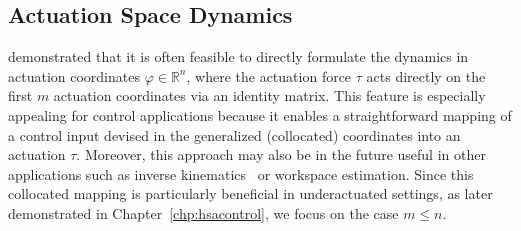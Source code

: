 \subsection{Actuation Space Dynamics}\label{sub:background:dynamics:actuation_space}
\citet{pustina2024input} demonstrated that it is often feasible to directly formulate the dynamics in actuation coordinates $\varphi \in \mathbb{R}^n$, where the actuation force $\tau$ acts directly on the first $m$ actuation coordinates via an identity matrix. This feature is especially appealing for control applications because it enables a straightforward mapping of a control input devised in the generalized (collocated) coordinates into an actuation $\tau$. Moreover, this approach may also be in the future useful in other applications such as inverse kinematics~\citep{della2025pushing} or workspace estimation. Since this collocated mapping is particularly beneficial in underactuated settings, as later demonstrated in Chapter~\ref{chp:hsacontrol}, we focus on the case $m \leq n$.


